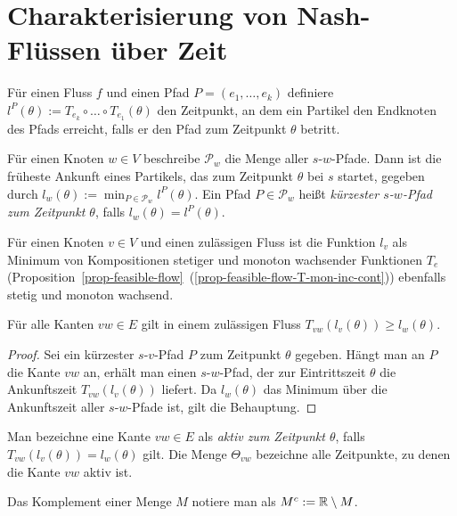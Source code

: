 

\section{Charakterisierung von Nash-Flüssen über Zeit}

\begin{definition}
	Für einen Fluss $f$ und einen Pfad $P=(e_1,\dots,e_k)$ definiere $l^P(\theta):=T_{e_k}\circ\dots\circ T_{e_1}(\theta)$ den Zeitpunkt, an dem ein Partikel den Endknoten des Pfads erreicht, falls er den Pfad zum Zeitpunkt $\theta$ betritt.
	
	Für einen Knoten $w\in V$ beschreibe $\mathcal{P}_w$ die Menge aller $s$-$w$-Pfade.
	Dann ist die früheste Ankunft eines Partikels, das zum Zeitpunkt $\theta$ bei $s$ startet, gegeben durch $l_w(\theta):=\min_{P\in\mathcal{P}_w}l^P(\theta)$.
	Ein Pfad $P\in \mathcal{P}_w$ heißt \emph{kürzester $s$-$w$-Pfad zum Zeitpunkt $\theta$},  falls $l_w(\theta)=l^P(\theta)$.
\end{definition}


Für einen Knoten $v \in V$ und einen zulässigen Fluss ist die Funktion $l_v$ als Minimum von Kompositionen stetiger und monoton wachsender Funktionen $T_e$ (Proposition~\ref{prop-feasible-flow}~(\ref{prop-feasible-flow-T-mon-inc-cont})) ebenfalls stetig und monoton wachsend.


\begin{lemma}\label{lemma-dreicksungl}
	Für alle Kanten $vw\in E$ gilt in einem zulässigen Fluss 
	$T_{vw}(l_v(\theta)) \geq l_w(\theta)$.
\end{lemma}
\begin{proof}
	Sei ein kürzester $s$-$v$-Pfad $P$ zum Zeitpunkt $\theta$ gegeben.
	Hängt man an $P$ die Kante $vw$ an, erhält man einen $s$-$w$-Pfad, der zur Eintrittszeit $\theta$ die Ankunftszeit $T_{vw}(l_v(\theta))$ liefert.
	Da $l_w(\theta)$ das Minimum über die Ankunftszeit aller $s$-$w$-Pfade ist, gilt die Behauptung.
\end{proof}

\begin{definition}
	Man bezeichne eine Kante $vw\in E$ als \emph{aktiv zum Zeitpunkt $\theta$}, falls $T_{vw}(l_v(\theta)) = l_w(\theta)$ gilt.
	Die Menge $\Theta_{vw}$ bezeichne alle Zeitpunkte, zu denen die Kante $vw$ aktiv ist.
\end{definition}
\begin{notation}
	Das Komplement einer Menge $M$ notiere man als $M^c:= \mathbb{R}\setminus M$.
\end{notation}

